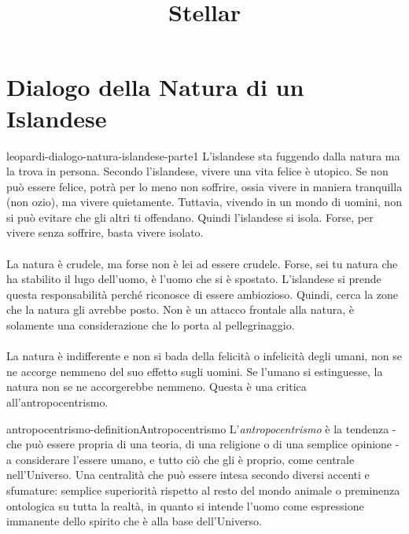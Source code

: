 \documentclass[preview]{standalone}
\begin{document}
\title{Stellar}
\genpage

\section{Dialogo della Natura di un Islandese}

\begin{snippet}{leopardi-dialogo-natura-islandese-parte1}
    L'islandese sta fuggendo dalla natura ma la trova in persona.
    Secondo l'islandese, vivere una vita felice è utopico.
    Se non può essere felice, potrà per lo meno non soffrire,
    ossia vivere in maniera tranquilla (non ozio), ma vivere quietamente.
    Tuttavia, vivendo in un mondo di uomini, non si può evitare 
    che gli altri ti offendano.
    Quindi l'islandese si isola.
    Forse, per vivere senza soffrire, basta vivere isolato.
    \\\\
    La natura è crudele, ma forse non è lei ad essere crudele.
    Forse, sei tu natura che ha stabilito il lugo dell'uomo,
    è l'uomo che si è spostato. L'islandese si prende questa responsabilità perché
    riconosce di essere ambiozioso. Quindi, cerca la zone che la natura gli avrebbe posto.
    Non è un attacco frontale alla natura, è solamente una considerazione
    che lo porta al pellegrinaggio.
    \\\\
    La natura è indifferente e non si bada della felicità o infelicità
    degli umani, non se ne accorge nemmeno del suo effetto sugli uomini.
    Se l'umano si estinguesse, la natura non se ne accorgerebbe nemmeno.
    Questa è una critica all'antropocentrismo.
\end{snippet}

\begin{snippetdefinition}{antropocentrismo-definition}{Antropocentrismo}
    L'\textit{antropocentrismo} è la tendenza -
    che può essere propria di una teoria, di una religione o di una semplice opinione -
    a considerare l'essere umano, e tutto ciò che gli è proprio,
    come centrale nell'Universo.
    Una centralità che può essere intesa secondo diversi accenti e sfumature:
    semplice superiorità rispetto al resto del mondo animale o preminenza ontologica su
    tutta la realtà, in quanto si intende l'uomo come espressione immanente
    dello spirito che è alla base dell'Universo. 
\end{snippetdefinition}
\end{document}
